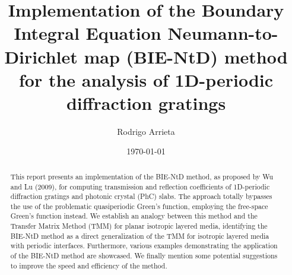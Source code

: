 \documentclass[reprint,amsmath,amssymb,
 aps]{revtex4-2}
\begin{document}

\title{Implementation of the Boundary Integral Equation Neumann-to-Dirichlet map (BIE-NtD) method for the analysis of 1D-periodic diffraction gratings}

\author{Rodrigo Arrieta}

\date{\today}%

\begin{abstract}
This report presents an implementation of the BIE-NtD method, as proposed by Wu and Lu (2009), for computing transmission and reflection coefficients of 1D-periodic diffraction gratings and photonic crystal (PhC) slabs. The approach totally bypasses the use of the problematic quasiperiodic Green's function, employing the free-space Green's function instead. We establish an analogy between this method and the Transfer Matrix Method (TMM) for planar isotropic layered media, identifying the BIE-NtD method as a direct generalization of the TMM for isotropic layered media with periodic interfaces. Furthermore, various examples demonstrating the application of the BIE-NtD method are showcased. We finally mention some potential suggestions to improve the speed and efficiency of the method.
\end{abstract}

\maketitle

\end{document}
